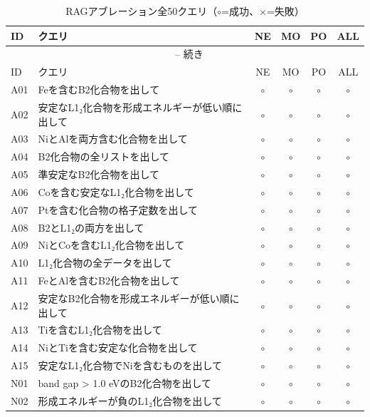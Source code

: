 \documentclass[3p]{elsarticle}
\begin{document}
\begin{longtable}{lp{5.5cm}cccc}
\caption{RAGアブレーション全50クエリ（$\circ$=成功、$\times$=失敗）}
\label{tab:rag_full} \\
\toprule
ID & クエリ & NE & MO & PO & ALL \\
\midrule
\endfirsthead
\multicolumn{6}{c}{\tablename~\thetable{} -- 続き} \\
\toprule
ID & クエリ & NE & MO & PO & ALL \\
\midrule
\endhead
\bottomrule
\endfoot

  A01 & Feを含むB2化合物を出して & $\circ$ & $\circ$ & $\circ$ & $\circ$ \\
  A02 & 安定なL1₂化合物を形成エネルギーが低い順に出して & $\circ$ & $\circ$ & $\circ$ & $\circ$ \\
  A03 & NiとAlを両方含む化合物を出して & $\circ$ & $\circ$ & $\circ$ & $\circ$ \\
  A04 & B2化合物の全リストを出して & $\circ$ & $\circ$ & $\circ$ & $\circ$ \\
  A05 & 準安定なB2化合物を出して & $\circ$ & $\circ$ & $\circ$ & $\circ$ \\
  A06 & Coを含む安定なL1₂化合物を出して & $\circ$ & $\circ$ & $\circ$ & $\circ$ \\
  A07 & Ptを含む化合物の格子定数を出して & $\circ$ & $\circ$ & $\circ$ & $\circ$ \\
  A08 & B2とL1₂の両方を出して & $\circ$ & $\circ$ & $\circ$ & $\circ$ \\
  A09 & NiとCoを含むL1₂化合物を出して & $\circ$ & $\circ$ & $\circ$ & $\circ$ \\
  A10 & L1₂化合物の全データを出して & $\circ$ & $\circ$ & $\circ$ & $\circ$ \\
  A11 & FeとAlを含むB2化合物を出して & $\circ$ & $\circ$ & $\circ$ & $\circ$ \\
  A12 & 安定なB2化合物を形成エネルギーが低い順に出して & $\circ$ & $\circ$ & $\circ$ & $\circ$ \\
  A13 & Tiを含むL1₂化合物を出して & $\circ$ & $\circ$ & $\circ$ & $\circ$ \\
  A14 & NiとTiを含む安定な化合物を出して & $\circ$ & $\circ$ & $\circ$ & $\circ$ \\
  A15 & 安定なL1₂化合物でNiを含むものを出して & $\circ$ & $\circ$ & $\circ$ & $\circ$ \\
  N01 & band gap > 1.0 eVのB2化合物を出して & $\circ$ & $\circ$ & $\circ$ & $\circ$ \\
  N02 & 形成エネルギーが負のL1₂化合物を出して & $\circ$ & $\circ$ & $\circ$ & $\circ$ \\

\end{longtable}
\end{document}
